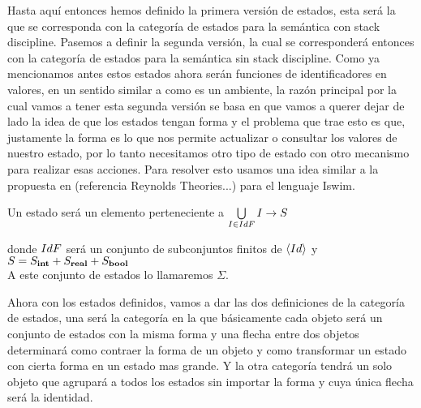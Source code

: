 Hasta aqu\'i entonces hemos definido la primera versi\'on de estados, esta ser\'a la que
se corresponda con la categor\'ia de estados para la sem\'antica con stack discipline.
Pasemos a definir la segunda versi\'on, la cual se corresponder\'a entonces con
la categor\'ia de estados para la sem\'antica sin stack discipline. Como ya
mencionamos antes estos estados ahora ser\'an funciones de identificadores
en valores, en un sentido similar a como es un ambiente, la raz\'on principal
por la cual vamos a tener esta segunda versi\'on se basa en que vamos a querer
dejar de lado la idea de que los estados tengan forma y el problema que 
trae esto es que, justamente la forma es lo que nos permite actualizar o consultar
los valores de nuestro estado, por lo tanto necesitamos otro tipo
de estado con otro mecanismo para realizar esas acciones.
Para resolver esto usamos una idea similar a la propuesta en (referencia Reynolds Theories...)
para el lenguaje Iswim.

\begin{definition}\label{algol:states}

Un estado ser\'a un elemento perteneciente a 
$\bigcup\limits_{I \in IdF} I \rightarrow S$

donde $IdF$ ser\'a un conjunto de subconjuntos finitos de $\langle Id \rangle$ y
$S = S_{\textbf{int}} + S_{\textbf{real}} + S_{\textbf{bool}}$\\

A este conjunto de estados lo llamaremos $\Sigma$.\\

\end{definition}

Ahora con los estados definidos, vamos a dar las dos definiciones de
la categor\'ia de estados, una ser\'a la categor\'ia en la que b\'asicamente cada objeto ser\'a
un conjunto de estados con la misma forma y una flecha entre dos objetos
determinar\'a como contraer la forma de un objeto y como transformar un estado
con cierta forma en un estado mas grande. Y la otra categor\'ia tendr\'a
un solo objeto que agrupar\'a a todos los estados sin importar la forma y
cuya \'unica flecha ser\'a la identidad.

